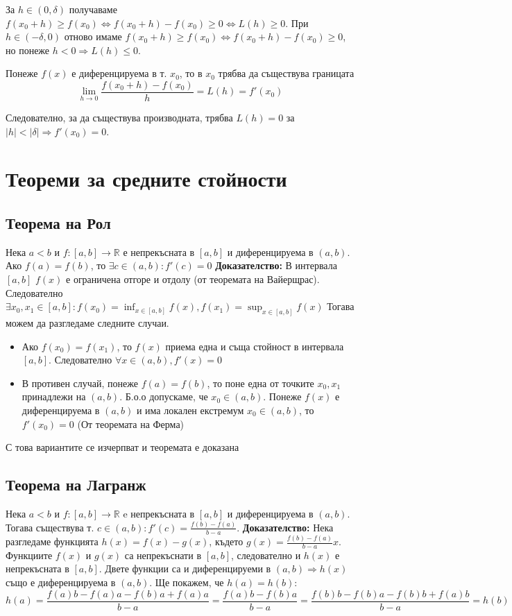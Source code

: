 \documentclass[fleqn,12pt]{article}
\begin{document}
За $h \in (0, \delta)$ получаваме $f(x_0 + h) \geq f(x_0) \Leftrightarrow f(x_0 + h) - f(x_0) \geq 0 \Leftrightarrow L(h) \geq 0$.
При $h \in (-\delta, 0)$ отново имаме $f(x_0 + h) \geq f(x_0) \Leftrightarrow f(x_0 + h) - f(x_0) \geq 0$,
но понеже $h < 0 \Rightarrow L(h) \leq 0$.

Понеже $f(x)$ е диференцируема в т. $x_0$, то в $x_0$ трябва да съществува границата
\[ \lim_{h \to 0} \frac{ f(x_0 + h)-f(x_0)}{h} = L(h) = f'(x_0) \]

Следователно, за да съществува производната, трябва $L(h) = 0$ за $|h| < |\delta| \Rightarrow f'(x_0) = 0$.

\section{Теореми  за  средните  стойности}
\subsection{Теорема на Рол}
Нека $a<b$ и $f:[a,b]\rightarrow\mathbb{R}$ е непрекъсната в $[a,b]$ и диференцируема в $(a,b)$. Ако $f(a) = f(b)$, то $\exists c \in (a,b): f'(c)=0$
\bigbreak
\textbf{Доказателство:}
В интервала $[a,b]$ $f(x)$ е ограничена отгоре и отдолу (от теоремата на Вайерщрас).
Следователно $\exists x_0,x_1 \in [a,b]: f(x_0)=\inf_{x \in [a,b]} f(x), f(x_1)=\sup_{x \in [a,b]} f(x)$
Тогава можем да разгледаме следните случаи.
\begin{itemize}
    \item Ако $f(x_0) = f(x_1)$, то $f(x)$ приема една и съща стойност в интервала $[a,b]$. Следователно $\forall x \in (a,b), f'(x)=0$ 

    \item В противен случай, понеже $f(a) = f(b)$, то поне една от точките $x_0,x_1$ принадлежи на $(a,b)$. Б.о.о допускаме, че $x_0 \in (a,b)$. Понеже $f(x)$ е диференцируема в $(a,b)$ и има локален екстремум $x_0 \in (a,b)$, то $f'(x_0) = 0$ (От теоремата на Ферма) 
\end{itemize}
С това вариантите се изчерпват и теоремата е доказана

\subsection{Теорема на Лагранж}
Нека $a<b$ и $f:[a,b]\rightarrow\mathbb{R}$ e непрекъсната в $[a,b]$ и диференцируема в $(a,b)$.
Тогава съществува т. $c \in (a,b): f'(c) = \frac{f(b)-f(a)}{b-a}$.
\bigbreak
\textbf{Доказателство:}
Нека разгледаме функцията $h(x)=f(x) - g(x)$, където $g(x) = \frac{f(b)-f(a)}{b-a}x$. Функциите $f(x)$ и $g(x)$ са непрекъснати в $[a,b]$, 
следователно и $h(x)$ е непрекъсната в $[a,b]$. Двете функции са и диференцируеми в $(a,b) \Rightarrow h(x)$ също е диференцируема в $(a,b)$.
Ще покажем, че $h(a) = h(b)$: 
\[ h(a)=\frac{f(a)b - f(a)a - f(b)a + f(a)a}{b-a} = \frac{f(a)b-f(b)a}{b-a} = \frac{f(b)b - f(b)a - f(b)b + f(a)b}{b-a} = h(b) \]
\end{document}
